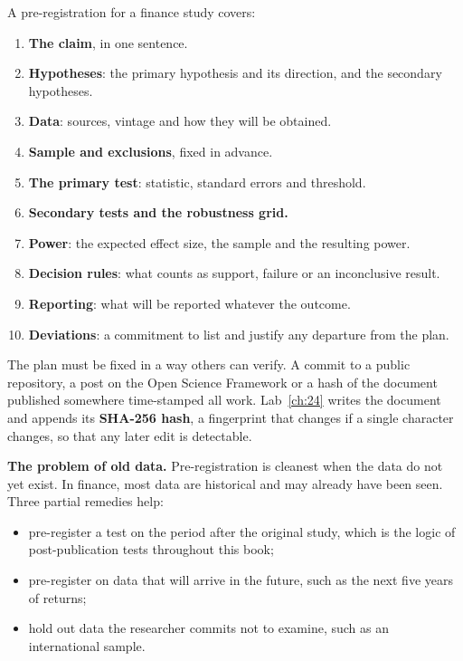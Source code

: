 A pre-registration for a finance study covers:

\begin{enumerate}
  \item \textbf{The claim}, in one sentence.
  \item \textbf{Hypotheses}: the primary hypothesis and its direction, and the secondary hypotheses.
  \item \textbf{Data}: sources, vintage and how they will be obtained.
  \item \textbf{Sample and exclusions}, fixed in advance.
  \item \textbf{The primary test}: statistic, standard errors and threshold.
  \item \textbf{Secondary tests and the robustness grid.}
  \item \textbf{Power}: the expected effect size, the sample and the resulting power.
  \item \textbf{Decision rules}: what counts as support, failure or an inconclusive result.
  \item \textbf{Reporting}: what will be reported whatever the outcome.
  \item \textbf{Deviations}: a commitment to list and justify any departure from the plan.
\end{enumerate}

The plan must be fixed in a way others can verify. A commit to a public repository, a post on the Open Science Framework or a hash of the document published somewhere time-stamped all work. Lab~\ref{ch:24} writes the document and appends its \textbf{SHA-256 hash}, a fingerprint that changes if a single character changes, so that any later edit is detectable.

\textbf{The problem of old data.} Pre-registration is cleanest when the data do not yet exist. In finance, most data are historical and may already have been seen. Three partial remedies help:

\begin{itemize}
  \item pre-register a test on the period after the original study, which is the logic of post-publication tests throughout this book;
  \item pre-register on data that will arrive in the future, such as the next five years of returns;
  \item hold out data the researcher commits not to examine, such as an international sample.
\end{itemize}


